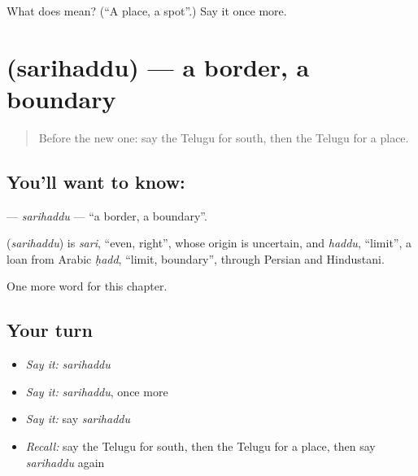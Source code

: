 \begin{tcolorbox}[breakable,colback=teal!4,colframe=teal!35!black,title={Before you move on}]
What does  mean? (\textquotedblleft{}A place, a spot\textquotedblright{}.) Say it once more.
\end{tcolorbox}
\section[\texorpdfstring{\te{సరిహద్దు} (sarihaddu)}{సరిహద్దు (sarihaddu)}]{ (sarihaddu) — a border, a boundary}

\label{lesson:TE-C291-sarihaddu}



\begin{quote}
Before the new one: say the Telugu for south, then the Telugu for a place.
\end{quote}

\subsection*{You'll want to know: }
\textbf{} — \emph{sarihaddu} — \textquotedblleft{}a border, a boundary\textquotedblright{}.

\begin{cousinweb}
\textbf{} (\emph{sarihaddu}) is \emph{sari}, \textquotedblleft{}even, right\textquotedblright{}, whose origin is uncertain, and \emph{haddu}, \textquotedblleft{}limit\textquotedblright{}, a loan from Arabic \emph{ḥadd}, \textquotedblleft{}limit, boundary\textquotedblright{}, through Persian and Hindustani.
\end{cousinweb}

\begin{grammarlens}[title={What you've built}]
One more word for this chapter.
\end{grammarlens}

\subsection*{Your turn}
\begin{itemize}
\raggedright
  \item \emph{Say it:} \emph{sarihaddu}
  \item \emph{Say it:} \emph{sarihaddu}, once more
  \item \emph{Say it:} say \emph{sarihaddu}
  \item \emph{Recall:} say the Telugu for south, then the Telugu for a place, then say \emph{sarihaddu} again
\end{itemize}


